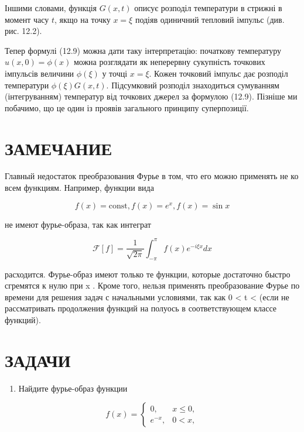 \documentclass[
  ukrainian,
]{article}
\providecommand{\tightlist}{%
  \setlength{\itemsep}{0pt}\setlength{\parskip}{0pt}}
\begin{document}
Іншими словами, функція \(G(x, t)\) описує розподіл температури в
стрижні в момент часу \(t\), якщо на точку \(x=\xi\) подіяв одиничний
тепловий імпульс (див. рис. 12.2).

Тепер формулі (12.9) можна дати таку інтерпретацію: початкову
температуру \(u(x,0)=\phi(x)\) можна розглядати як неперервну сукупність
точкових імпульсів величини \(\phi(\xi)\) у точці \(x=\xi\). Кожен
точковий імпульс дає розподіл температури \(\phi(\xi)G(x,t)\).
Підсумковий розподіл знаходиться сумуванням (інтегруванням) температур
від точкових джерел за формулою (12.9). Пізніше ми побачимо, що це один
із проявів загального принципу суперпозиції.

\section{ЗАМЕЧАНИЕ}\label{ux437ux430ux43cux435ux447ux430ux43dux438ux435}

Главный недостаток преобразования Фурье в том, что его можно применять
не ко всем функциям. Например, функции вида

\[
f(x) = \text{const},
f(x) = e^x,
f(x) = \sin x
\]

не имеют фурье-образа, так как интеграт

\[
\mathcal{F}[f] = \frac{1}{\sqrt{2\pi}} \int_{-\pi}^{\pi} f(x) e^{-i\xi x} dx
\]

расходится. Фурье-образ имеют только те функции, которые достаточно
быстро сгремятся к нулю при \textbar x\textbar{} \to \infty . Кроме
того, нельзя применять преобразование Фурье по времени для решения задач
с начальными условиями, так как 0 \textless{} t \textless{}
\infty  (если не рассматривать продолжения функций на полуось в
соответствующем классе функций).

\section{ЗАДАЧИ}\label{ux437ux430ux434ux430ux447ux438-1}

\begin{enumerate}
\def\labelenumi{\arabic{enumi}.}
\tightlist
\item
  Найдите фурье-образ функции
\end{enumerate}

\[
f(x) =
\begin{cases} 0, & x \leq 0, \\ e^{-x}, & 0 < x, \end{cases}
\]
\end{document}
